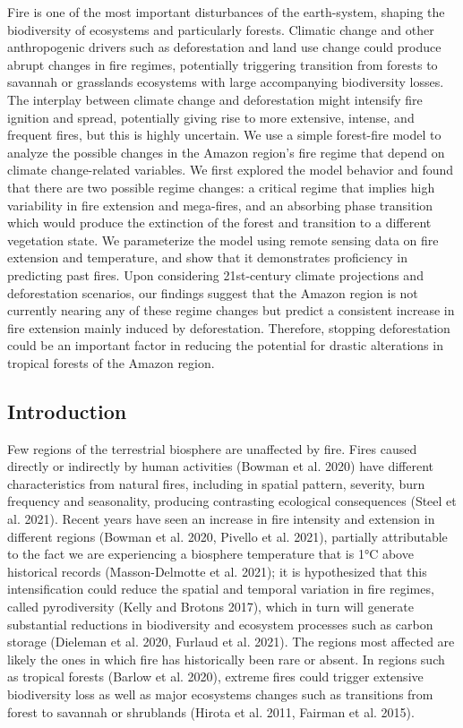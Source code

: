 \documentclass[
]{article}
\begin{document}
Fire is one of the most important disturbances of the earth-system,
shaping the biodiversity of ecosystems and particularly forests.
Climatic change and other anthropogenic drivers such as deforestation
and land use change could produce abrupt changes in fire regimes,
potentially triggering transition from forests to savannah or grasslands
ecosystems with large accompanying biodiversity losses. The interplay
between climate change and deforestation might intensify fire ignition
and spread, potentially giving rise to more extensive, intense, and
frequent fires, but this is highly uncertain. We use a simple
forest-fire model to analyze the possible changes in the Amazon region's
fire regime that depend on climate change-related variables. We first
explored the model behavior and found that there are two possible regime
changes: a critical regime that implies high variability in fire
extension and mega-fires, and an absorbing phase transition which would
produce the extinction of the forest and transition to a different
vegetation state. We parameterize the model using remote sensing data on
fire extension and temperature, and show that it demonstrates
proficiency in predicting past fires. Upon considering 21st-century
climate projections and deforestation scenarios, our findings suggest
that the Amazon region is not currently nearing any of these regime
changes but predict a consistent increase in fire extension mainly
induced by deforestation. Therefore, stopping deforestation could be an
important factor in reducing the potential for drastic alterations in
tropical forests of the Amazon region.

\subsection{Introduction}\label{introduction}

Few regions of the terrestrial biosphere are unaffected by fire. Fires
caused directly or indirectly by human activities (Bowman et al. 2020)
have different characteristics from natural fires, including in spatial
pattern, severity, burn frequency and seasonality, producing contrasting
ecological consequences (Steel et al. 2021). Recent years have seen an
increase in fire intensity and extension in different regions (Bowman et
al. 2020, Pivello et al. 2021), partially attributable to the fact we
are experiencing a biosphere temperature that is 1°C above historical
records (Masson-Delmotte et al. 2021); it is hypothesized that this
intensification could reduce the spatial and temporal variation in fire
regimes, called pyrodiversity (Kelly and Brotons 2017), which in turn
will generate substantial reductions in biodiversity and ecosystem
processes such as carbon storage (Dieleman et al. 2020, Furlaud et al.
2021). The regions most affected are likely the ones in which fire has
historically been rare or absent. In regions such as tropical forests
(Barlow et al. 2020), extreme fires could trigger extensive biodiversity
loss as well as major ecosystems changes such as transitions from forest
to savannah or shrublands (Hirota et al. 2011, Fairman et al. 2015).
\end{document}
